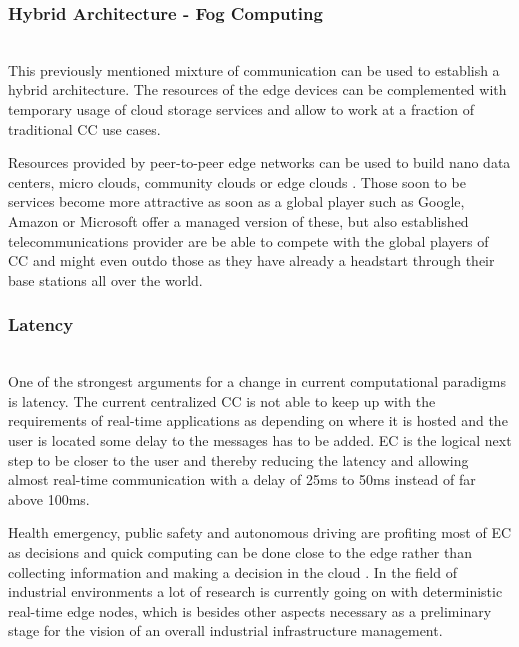 \subsubsection{Hybrid Architecture - Fog Computing}\hspace*{\fill} \\
This previously mentioned mixture of communication can be used to establish a hybrid architecture. The resources of the edge devices can be complemented with temporary usage of cloud storage services \cite{GarciaLopez:2015:ECV:2831347.2831354} and allow to work at a fraction of traditional CC use cases.

Resources provided by peer-to-peer edge networks can be used to build nano data centers, micro clouds, community clouds or edge clouds \cite{GarciaLopez:2015:ECV:2831347.2831354}. Those soon to be services become more attractive as soon as a global player such as Google, Amazon or Microsoft offer a managed version of these, but also established telecommunications provider are be able to compete with the global players of CC and might even outdo those as they have already a headstart through their base stations all over the world.

\subsubsection{Latency}\hspace*{\fill} \\
One of the strongest arguments for a change in current computational paradigms is latency. The current centralized CC is not able to keep up with the requirements of real-time applications as depending on where it is hosted and the user is located some delay to the messages has to be added.
EC is the logical next step to be closer to the user and thereby reducing the latency and allowing almost real-time communication with a delay of 25ms to 50ms instead of far above 100ms.

Health emergency, public safety and autonomous driving are profiting most of EC as decisions and quick computing can be done close to the edge rather than collecting information and making a decision in the cloud \cite{7488250}. In the field of industrial environments a lot of research is currently going on with deterministic real-time edge nodes, which is besides other aspects necessary as a preliminary stage for the vision of an overall industrial infrastructure management.

